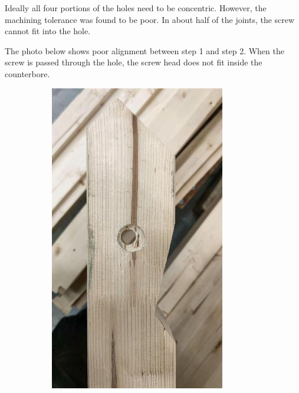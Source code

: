 \documentclass[11pt]{book}
\begin{document}
\printbibliography
Ideally all four portions of the holes need to be concentric. However, the machining tolerance was found to be poor. In about half of the joints, the screw cannot fit into the hole.

The photo below shows poor alignment between step 1 and step 2. When the screw is passed through the hole, the screw head does not fit inside the counterbore.

\begin{figure}[H]
\centering
\begin{subfigure}[b]{0.45\textwidth}
\centering
\includegraphics[width=\textwidth]{./images/image85.jpeg}

\end{subfigure}
\end{figure}
\end{document}
